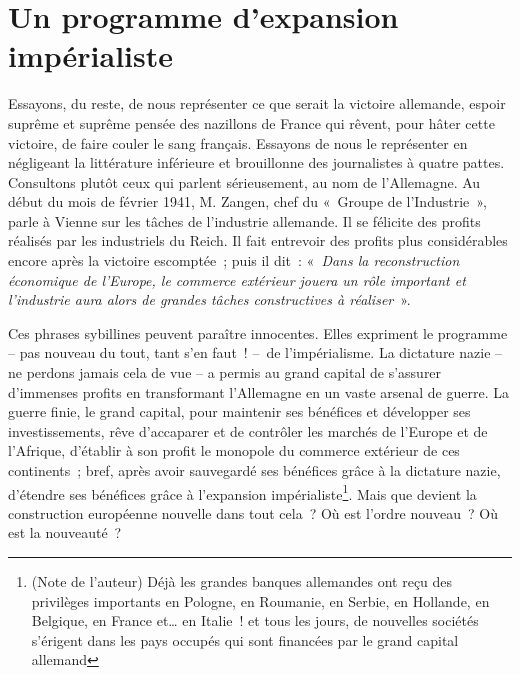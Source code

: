 \documentclass[french,twoside]{book} %
\begin{document}
\section[Un programme d’expansion impérialiste]{Un programme d’expansion impérialiste}
\noindent Essayons, du reste, de nous représenter ce que serait la victoire allemande, espoir suprême et suprême pensée des nazillons de France qui rêvent, pour hâter cette victoire, de faire couler le sang français. Essayons de nous le représenter en négligeant la littérature inférieure et brouillonne des journalistes à quatre pattes. Consultons plutôt ceux qui parlent sérieusement, au nom de l’Allemagne. Au début du mois de février 1941, M. Zangen, chef du « Groupe de l’Industrie », parle à Vienne sur les tâches de l’industrie allemande. Il se félicite des profits réalisés par les industriels du Reich. Il fait entrevoir des profits plus considérables encore après la victoire escomptée ; puis il dit : « \emph{Dans la reconstruction économique de l’Europe, le commerce extérieur jouera un rôle important et l’industrie aura alors de grandes tâches constructives à réaliser} ».\par
Ces phrases sybillines peuvent paraître innocentes. Elles expriment le programme – pas nouveau du tout, tant s’en faut ! – de l’impérialisme. La dictature nazie – ne perdons jamais cela de vue – a permis au grand capital de s’assurer d’immenses profits en transformant l’Allemagne en un vaste arsenal de guerre. La guerre finie, le grand capital, pour maintenir ses bénéfices et développer ses investissements, rêve d’accaparer et de contrôler les marchés de l’Europe et de l’Afrique, d’établir à son profit le monopole du commerce extérieur de ces continents ; bref, après avoir sauvegardé ses bénéfices grâce à la dictature nazie, d’étendre ses bénéfices grâce à l’expansion impérialiste\footnote{(Note de l’auteur) Déjà les grandes banques allemandes ont reçu des privilèges importants en Pologne, en Roumanie, en Serbie, en Hollande, en Belgique, en France et… en Italie ! et tous les jours, de nouvelles sociétés s’érigent dans les pays occupés qui sont financées par le grand capital allemand}. Mais que devient la construction européenne nouvelle dans tout cela ? Où est l’ordre nouveau ? Où est la nouveauté ?\par
\end{document}
